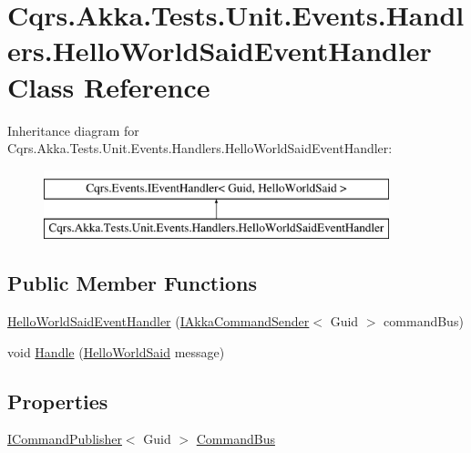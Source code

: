 \hypertarget{classCqrs_1_1Akka_1_1Tests_1_1Unit_1_1Events_1_1Handlers_1_1HelloWorldSaidEventHandler}{}\section{Cqrs.\+Akka.\+Tests.\+Unit.\+Events.\+Handlers.\+Hello\+World\+Said\+Event\+Handler Class Reference}
\label{classCqrs_1_1Akka_1_1Tests_1_1Unit_1_1Events_1_1Handlers_1_1HelloWorldSaidEventHandler}
Inheritance diagram for Cqrs.\+Akka.\+Tests.\+Unit.\+Events.\+Handlers.\+Hello\+World\+Said\+Event\+Handler\+:\begin{figure}[H]
\begin{center}
\leavevmode
\includegraphics[height=2.000000cm]{classCqrs_1_1Akka_1_1Tests_1_1Unit_1_1Events_1_1Handlers_1_1HelloWorldSaidEventHandler}
\end{center}
\end{figure}
\subsection*{Public Member Functions}
\begin{DoxyCompactItemize}
\item 
\hyperlink{classCqrs_1_1Akka_1_1Tests_1_1Unit_1_1Events_1_1Handlers_1_1HelloWorldSaidEventHandler_a0eb8ed23d99a9d434e3bcfdb0ae99e12}{Hello\+World\+Said\+Event\+Handler} (\hyperlink{interfaceCqrs_1_1Akka_1_1Commands_1_1IAkkaCommandSender}{I\+Akka\+Command\+Sender}$<$ Guid $>$ command\+Bus)
\item 
void \hyperlink{classCqrs_1_1Akka_1_1Tests_1_1Unit_1_1Events_1_1Handlers_1_1HelloWorldSaidEventHandler_accb924e5856731b18120c21daed0f52a}{Handle} (\hyperlink{classCqrs_1_1Akka_1_1Tests_1_1Unit_1_1Events_1_1HelloWorldSaid}{Hello\+World\+Said} message)
\end{DoxyCompactItemize}
\subsection*{Properties}
\begin{DoxyCompactItemize}
\item 
\hyperlink{interfaceCqrs_1_1Commands_1_1ICommandPublisher}{I\+Command\+Publisher}$<$ Guid $>$ \hyperlink{classCqrs_1_1Akka_1_1Tests_1_1Unit_1_1Events_1_1Handlers_1_1HelloWorldSaidEventHandler_a67473b7f3dc275d04fe079006da89f6c}{Command\+Bus}
\end{DoxyCompactItemize}


